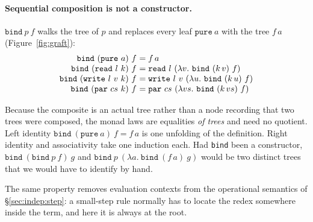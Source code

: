 \documentclass[11pt,a4paper]{article}
\theoremstyle{definition}
\theoremstyle{plain}
\theoremstyle{remark}
\begin{document}
\paragraph{Sequential composition is not a constructor.}
$\texttt{bind}\ p\ f$ walks the tree of $p$ and replaces every leaf $\texttt{pure}\ a$ with
the tree $f\,a$ (Figure~\ref{fig:graft}):
\[
\begin{array}{r@{\ }l}
  \texttt{bind}\ (\texttt{pure}\ a)\ f &= f\,a \\
  \texttt{bind}\ (\texttt{read}\ l\ k)\ f &= \texttt{read}\ l\ (\lambda v.\ \texttt{bind}\ (k\,v)\ f) \\
  \texttt{bind}\ (\texttt{write}\ l\ v\ k)\ f &= \texttt{write}\ l\ v\ (\lambda u.\ \texttt{bind}\ (k\,u)\ f) \\
  \texttt{bind}\ (\texttt{par}\ cs\ k)\ f &= \texttt{par}\ cs\ (\lambda vs.\ \texttt{bind}\ (k\,vs)\ f)
\end{array}
\]

Because the composite is an actual tree rather than a node recording that two trees were
composed, the monad laws are equalities \emph{of trees} and need no quotient. Left identity
$\texttt{bind}\ (\texttt{pure}\ a)\ f = f\,a$ is one unfolding of the definition. Right
identity and associativity take one induction each. Had \texttt{bind} been a constructor,
$\texttt{bind}\ (\texttt{bind}\ p\ f)\ g$ and
$\texttt{bind}\ p\ (\lambda a.\ \texttt{bind}\ (f\,a)\ g)$ would be two distinct trees that
we would have to identify by hand.

The same property removes evaluation contexts from the operational semantics of
\S\ref{sec:indep:step}: a small-step rule normally has to locate the redex somewhere inside
the term, and here it is always at the root.
\end{document}
